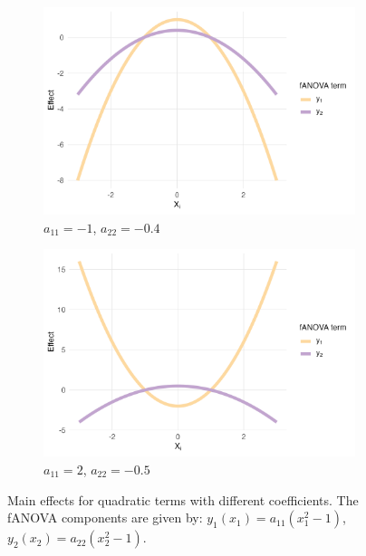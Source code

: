 \begin{figure}[htpb]
    \centering
    \begin{subfigure}[t]{0.49\textwidth}
        \includegraphics[width=\textwidth]{images/experiment_section/quadratic_a1p00_a2p00_a11m10_a22m04_a12p00_rhop00_main.png}
        \caption{$a_{11} = -1$, $a_{22} = -0.4$}
    \end{subfigure}%
    \hfill
    \begin{subfigure}[t]{0.49\textwidth}
        \includegraphics[width=\textwidth]{images/experiment_section/quadratic_a1p00_a2p00_a11p20_a22m05_a12p00_rhop00_main.png}
        \caption{$a_{11} = 2$, $a_{22} = -0.5$}
    \end{subfigure}
    \caption{Main effects for quadratic terms with different coefficients. The fANOVA components are given by: $y_1(x_1) = a_{11}(x_1^2 - 1)$, $y_2(x_2) = a_{22}(x_2^2 - 1)$.}
    \label{fig:quadratic_main_effects}
\end{figure}


